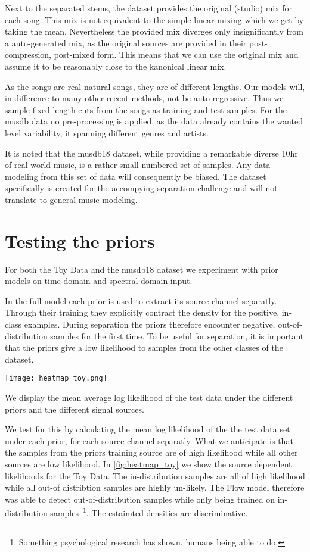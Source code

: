Next to the separated stems, the dataset provides the original (studio) mix for each song. This mix is not equivalent to the simple linear mixing which we get by taking the mean. Nevertheless the provided mix diverges only insignificantly from a auto-generated mix, as the original sources are provided in their post-compression, post-mixed form. This means that we can use the original mix and assume it to be reasonably close to the kanonical linear mix.

As the songs are real natural songs, they are of different lengths. Our models will, in difference to many other recent methods, not be auto-regressive. Thus we sample fixed-length cuts from the songs as training and test samples. For the musdb data no pre-processing is applied, as the data already contains the wanted level variability, it spanning different genres and artists.

It is noted that the musdb18 dataset, while providing a remarkable diverse 10hr of real-world music, is a rather small numbered set of samples. Any data modeling from this set of data will consequently be biased. The dataset specifically is created for the accompying separation challenge and will not translate to general music modeling.

\section{Testing the priors}

For both the Toy Data and the musdb18 dataset we experiment with prior models on time-domain and spectral-domain input.

In the full model each prior is used to extract its source channel separatly. Through their training they explicitly contract the density for the positive, in-class examples. During separation the priors therefore encounter negative, out-of-distribution samples for the first time. To be useful for separation, it is important that the priors give a low likelihood to samples from the other classes of the dataset.

\begin{marginfigure}
    \texttt{[image: heatmap\_toy.png]}%
    \caption{We display the mean average log likelihood of the test data under the different priors and the different signal sources.}%
    \label{fig:heatmap_toy}
\end{marginfigure}

We test for this by calculating the mean log likelihood of the the test data set under each prior, for each source channel separatly. What we anticipate is that the samples from the priors training source are of high likelihood while all other sources are low likelihood. In \cref{fig:heatmap_toy} we show the source dependent likelihoods for the Toy Data. The in-distribution samples are all of high likelihood while all out-of distribtion samples are highly un-likely. The Flow model therefore was able to detect out-of-distribution samples while only being trained on in-distribution samples~\footnote{Something psychological research has shown, humans being able to do.}. The estaimted densities are discriminative.

